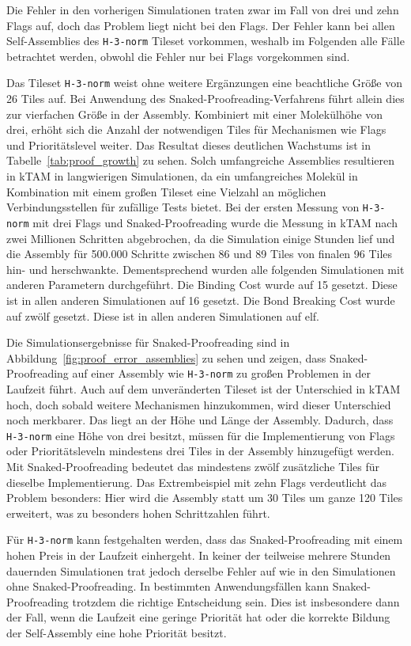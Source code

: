 Die Fehler in den vorherigen Simulationen traten zwar im Fall von drei und zehn Flags auf, doch das Problem liegt nicht bei den Flags. Der Fehler kann bei allen Self-Assemblies des \texttt{H-3-norm} Tileset vorkommen, weshalb im Folgenden alle Fälle betrachtet werden, obwohl die Fehler nur bei Flags vorgekommen sind.

Das Tileset \texttt{H-3-norm} weist ohne weitere Ergänzungen eine beachtliche Größe von 26 Tiles auf. Bei Anwendung des Snaked-Proofreading-Verfahrens führt allein dies zur vierfachen Größe in der Assembly. Kombiniert mit einer Molekülhöhe von drei, erhöht sich die Anzahl der notwendigen Tiles für Mechanismen wie Flags und Prioritätslevel weiter. Das Resultat dieses deutlichen Wachstums ist in Tabelle~\ref{tab:proof_growth} zu sehen. Solch umfangreiche Assemblies resultieren in kTAM in langwierigen Simulationen, da ein umfangreiches Molekül in Kombination mit einem großen Tileset eine Vielzahl an möglichen Verbindungsstellen für zufällige Tests bietet. Bei der ersten Messung von \texttt{H-3-norm} mit drei Flags und Snaked-Proofreading wurde die Messung in kTAM nach zwei Millionen Schritten abgebrochen, da die Simulation einige Stunden lief und die Assembly für 500.000 Schritte zwischen 86 und 89 Tiles von finalen 96 Tiles hin- und herschwankte. Dementsprechend wurden alle folgenden Simulationen mit anderen Parametern durchgeführt. Die Binding Cost wurde auf 15 gesetzt. Diese ist in allen anderen Simulationen auf 16 gesetzt. Die Bond Breaking Cost wurde auf zwölf gesetzt. Diese ist in allen anderen Simulationen auf elf.


Die Simulationsergebnisse für Snaked-Proofreading sind in Abbildung~\ref{fig:proof_error_assemblies} zu sehen und zeigen, dass Snaked-Proofreading auf einer Assembly wie \texttt{H-3-norm} zu großen Problemen in der Laufzeit führt. Auch auf dem unveränderten Tileset ist der Unterschied in kTAM hoch, doch sobald weitere Mechanismen hinzukommen, wird dieser Unterschied noch merkbarer. Das liegt an der Höhe und Länge der Assembly. Dadurch, dass \texttt{H-3-norm} eine Höhe von drei besitzt, müssen für die Implementierung von Flags oder Prioritätsleveln mindestens drei Tiles in der Assembly hinzugefügt werden. Mit Snaked-Proofreading bedeutet das mindestens zwölf zusätzliche Tiles für dieselbe Implementierung. Das Extrembeispiel mit zehn Flags verdeutlicht das Problem besonders: Hier wird die Assembly statt um 30 Tiles um ganze 120 Tiles erweitert, was zu besonders hohen Schrittzahlen führt.

Für \texttt{H-3-norm} kann festgehalten werden, dass das Snaked-Proofreading mit einem hohen Preis in der Laufzeit einhergeht. In keiner der teilweise mehrere Stunden dauernden Simulationen trat jedoch derselbe Fehler auf wie in den Simulationen ohne Snaked-Proofreading. In bestimmten Anwendungsfällen kann Snaked-Proofreading trotzdem die richtige Entscheidung sein. Dies ist insbesondere dann der Fall, wenn die Laufzeit eine geringe Priorität hat oder die korrekte Bildung der Self-Assembly eine hohe Priorität besitzt.

